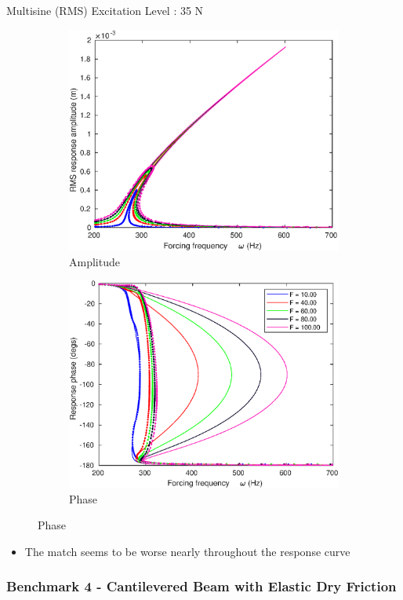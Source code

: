 \documentclass[aspectratio=169]{beamer}
\begin{document}
\begin{frame}[allowframebreaks]
  \begin{block}{Multisine (RMS) Excitation Level : 35 N}
    \begin{figure}
      \centering
      \begin{subfigure}{0.5\linewidth}
        \centering
        \includegraphics[width=0.8\linewidth]{../../../benchmark1/fig/pnlssfrf_A35_Amp}
        \caption{Amplitude}
      \end{subfigure}%
      \begin{subfigure}{0.5\linewidth}
        \centering
        \includegraphics[width=0.8\linewidth]{../../../benchmark1/fig/pnlssfrf_A35_Phase}
        \caption{Phase}
      \end{subfigure}
    \end{figure}
  \end{block}
  \vspace{-0.75cm}  
  \begin{itemize}
  \item The match seems to be worse nearly throughout the response curve
  \end{itemize}  
\end{frame}


\begin{frame}
  \frametitle{Benchmark 4 - Cantilevered Beam with Elastic Dry
    Friction}
  
\end{frame}
\end{document}
